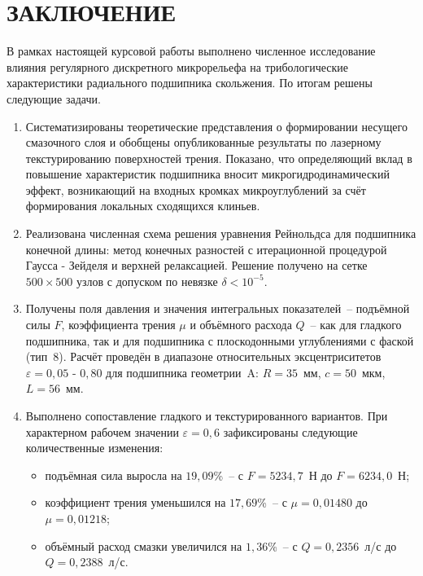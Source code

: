 \section*{ЗАКЛЮЧЕНИЕ}
{}

В рамках настоящей курсовой работы выполнено численное исследование влияния регулярного дискретного микрорельефа на трибологические характеристики радиального подшипника скольжения. По итогам решены следующие задачи.

\begin{enumerate}
    \item Систематизированы теоретические представления о формировании несущего смазочного слоя и обобщены опубликованные результаты по лазерному текстурированию поверхностей трения. Показано, что определяющий вклад в повышение характеристик подшипника вносит микрогидродинамический эффект, возникающий на входных кромках микроуглублений за счёт формирования локальных сходящихся клиньев.

    \item Реализована численная схема решения уравнения Рейнольдса для подшипника конечной длины: метод конечных разностей с итерационной процедурой Гаусса - Зейделя и верхней релаксацией. Решение получено на сетке $500 \times 500$ узлов с допуском по невязке $\delta < 10^{-5}$.

    \item Получены поля давления и значения интегральных показателей~-- подъёмной силы $F$, коэффициента трения $\mu$ и объёмного расхода $Q$~-- как для гладкого подшипника, так и для подшипника с плоскодонными углублениями с фаской (тип~8). Расчёт проведён в диапазоне относительных эксцентриситетов $\varepsilon = 0{,}05\text{ - }0{,}80$ для подшипника геометрии~A: $R = 35$~мм, $c = 50$~мкм, $L = 56$~мм.

    \item Выполнено сопоставление гладкого и текстурированного вариантов. При характерном рабочем значении $\varepsilon = 0{,}6$ зафиксированы следующие количественные изменения:
    \begin{itemize}
        \item подъёмная сила выросла на $19{,}09$\%~-- с $F = 5234{,}7$~Н до $F = 6234{,}0$~Н;
        \item коэффициент трения уменьшился на $17{,}69$\%~-- с $\mu = 0{,}01480$ до $\mu = 0{,}01218$;
        \item объёмный расход смазки увеличился на $1{,}36$\%~-- с $Q = 0{,}2356$~л/с до $Q = 0{,}2388$~л/с.
    \end{itemize}
\end{enumerate}

